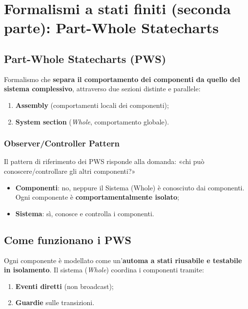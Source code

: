 \chapter{Formalismi a stati finiti (seconda parte): Part-Whole Statecharts}
\label{cap:formalismi-2}

\section{Part-Whole Statecharts (PWS)}
\begin{defn}
Formalismo che \textbf{separa il comportamento dei componenti da quello del sistema complessivo}, attraverso due sezioni distinte e parallele:
\begin{enumerate}
    \item \textbf{Assembly} (comportamenti locali dei componenti);
    \item \textbf{System section} (\emph{Whole}, comportamento globale).
\end{enumerate}
\end{defn}

\subsection{Observer/Controller Pattern}
Il pattern di riferimento dei PWS risponde alla domanda: «chi può conoscere/controllare gli altri componenti?»
\begin{itemize}
    \item \textbf{Componenti}: no, neppure il Sistema (Whole) è conosciuto dai componenti. Ogni componente è \textbf{comportamentalmente isolato};
    \item \textbf{Sistema}: sì, conosce e controlla i componenti.
\end{itemize}

\section{Come funzionano i PWS}
Ogni componente è modellato come un'\textbf{automa a stati riusabile e testabile in isolamento}. Il sistema (\emph{Whole}) coordina i componenti tramite:
\begin{enumerate}
    \item \textbf{Eventi diretti} (non broadcast);
    \item \textbf{Guardie} sulle transizioni.
\end{enumerate}

